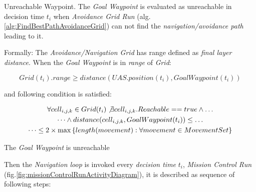 \begin{definition}{Unreachable Waypoint}\label{def:unreachable Waypoint}. The \emph{Goal Waypoint} is evaluated as unreachable in decision time $t_i$ when \emph{Avoidance Grid Run} (alg. \ref{alg:FindBestPathAvoidanceGrid}) can not find the \emph{navigation/avoidance path} leading to it.

\noindent Formally: The \emph{Avoidance/Navigation Grid} has range defined as \emph{final layer distance}. When the \emph{Goal Waypoint} is in  \emph{range} of \emph{Grid}:

\begin{equation}
    Grid(t_i).range \ge distance(UAS.position(t_i),GoalWaypoint(t_i))
\end{equation}

\noindent and following condition is satisfied:

\begin{multline}\label{eq:unreachableWaypoint}
    \forall cell_{i,j,k}\in Grid(t_i) \not\exists cell_{i,j,k}. Reachable == true \wedge\dots  \\\dots\wedge distance(cell_{i,j,k}, Goal Waypoint(t_i)) \le\dots \\ \dots\le 2 \times \max \left\{length(movement):\forall movement\in MovementSet\right\}
\end{multline}

\noindent The \emph{Goal Waypoint} is unreachable

\end{definition}

Then the \emph{Navigation loop} is invoked  every \emph{decision time} $t_i$, \emph{Mission Control Run} (fig.\ref{fig:missionControlRunActivityDiagram}), it is described as sequence of following steps:

